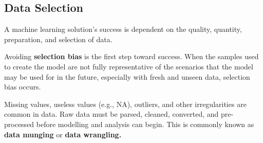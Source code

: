 \documentclass[11pt, twosides]{article}
\begin{document}
\subsection{Data Selection}
A machine learning solution's success is dependent on the quality, quantity, preparation, and selection of data.

Avoiding \textbf{selection bias} is the first step toward success. When the samples used to create the model are not fully representative of the scenarios that the model may be used for in the future, especially with fresh and unseen data, selection bias occurs.

Missing values, useless values (e.g., NA), outliers, and other irregularities are common in data. Raw data must be parsed, cleaned, converted, and pre-processed before modelling and analysis can begin. This is commonly known as \textbf{data munging} or \textbf{data wrangling.}

\end{document}
